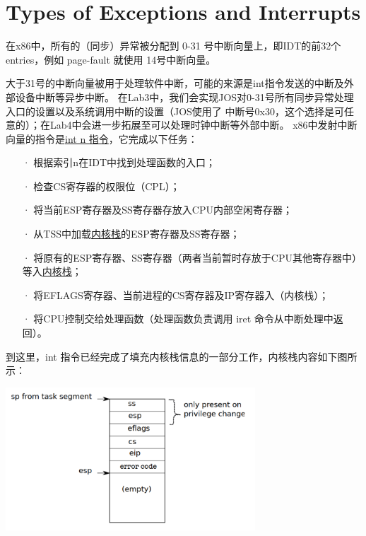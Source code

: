 \documentclass[12pt, letterpaper]{report}
\begin{document}
\section[\large Types of Exceptions and Interrupts]{Types of Exceptions and Interrupts}
在x86中，所有的（同步）异常被分配到 0-31 号中断向量上，即IDT的前32个entries，例如 page-fault 就使用
14号中断向量。\par
大于31号的中断向量被用于处理软件中断，可能的来源是int指令发送的中断及外部设备中断等异步中断。
在Lab3中，我们会实现JOS对0-31号所有同步异常处理入口的设置以及系统调用中断的设置（JOS使用了
中断号0x30，这个选择是可任意的）；在Lab4中会进一步拓展至可以处理时钟中断等外部中断。
x86中发射中断向量的指令是\underline{int n 指令}，它完成以下任务：\par
\begin{itemize}
    \item[·]根据索引n在IDT中找到处理函数的入口； \par
    \item[·]检查CS寄存器的权限位（CPL）； \par
    \item[·]将当前ESP寄存器及SS寄存器存放入CPU内部空闲寄存器； \par
    \item[·]从TSS中加载\underline{内核栈}的ESP寄存器及SS寄存器； \par
    \item[·]将原有的ESP寄存器、SS寄存器（两者当前暂时存放于CPU其他寄存器中）等入\underline{内核栈}； \par
    \item[·]将EFLAGS寄存器、当前进程的CS寄存器及IP寄存器入（内核栈）；\par
    \item[·]将CPU控制交给处理函数（处理函数负责调用 iret 命令从中断处理中返回）。 \par
\end{itemize}
到这里，int 指令已经完成了填充内核栈信息的一部分工作，内核栈内容如下图所示：\par 
\quad \par 
{
\centering
\includegraphics[width=0.7\textwidth]{interrupt_kstack} \par
}
\end{document}
